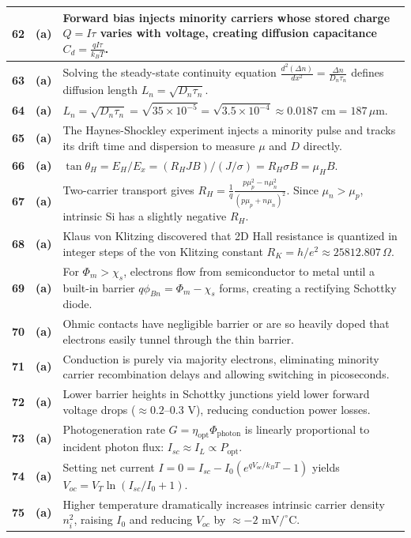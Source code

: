 {\begin{tabularx}{\textwidth}{|c|c|X|}
\textbf{62} & \textbf{(a)} & Forward bias injects minority carriers whose stored charge $Q = I\tau$ varies with voltage, creating diffusion capacitance $C_d = \frac{q I \tau}{k_BT}$. \\ \hline
\textbf{63} & \textbf{(a)} & Solving the steady-state continuity equation $\frac{d^2(\Delta n)}{dx^2} = \frac{\Delta n}{D_n\tau_n}$ defines diffusion length $L_n = \sqrt{D_n\tau_n}$. \\ \hline
\textbf{64} & \textbf{(a)} & $L_n = \sqrt{D_n \tau_n} = \sqrt{35 \times 10^{-5}} = \sqrt{3.5 \times 10^{-4}} \approx 0.0187\text{ cm} = 187\,\mu\text{m}$. \\ \hline
\textbf{65} & \textbf{(a)} & The Haynes-Shockley experiment injects a minority pulse and tracks its drift time and dispersion to measure $\mu$ and $D$ directly. \\ \hline
\textbf{66} & \textbf{(a)} & $\tan\theta_H = E_H / E_x = (R_H J B)/ (J/\sigma) = R_H \sigma B = \mu_H B$. \\ \hline
\textbf{67} & \textbf{(a)} & Two-carrier transport gives $R_H = \frac{1}{q}\frac{p\mu_p^2 - n\mu_n^2}{(p\mu_p + n\mu_n)^2}$. Since $\mu_n > \mu_p$, intrinsic Si has a slightly negative $R_H$. \\ \hline
\textbf{68} & \textbf{(a)} & Klaus von Klitzing discovered that 2D Hall resistance is quantized in integer steps of the von Klitzing constant $R_K = h/e^2 \approx 25812.807\,\Omega$. \\ \hline
\textbf{69} & \textbf{(a)} & For $\Phi_m > \chi_s$, electrons flow from semiconductor to metal until a built-in barrier $q\phi_{Bn} = \Phi_m - \chi_s$ forms, creating a rectifying Schottky diode. \\ \hline
\textbf{70} & \textbf{(a)} & Ohmic contacts have negligible barrier or are so heavily doped that electrons easily tunnel through the thin barrier. \\ \hline
\textbf{71} & \textbf{(a)} & Conduction is purely via majority electrons, eliminating minority carrier recombination delays and allowing switching in picoseconds. \\ \hline
\textbf{72} & \textbf{(a)} & Lower barrier heights in Schottky junctions yield lower forward voltage drops ($\approx 0.2\text{--}0.3\text{ V}$), reducing conduction power losses. \\ \hline
\textbf{73} & \textbf{(a)} & Photogeneration rate $G = \eta_{\text{opt}}\Phi_{\text{photon}}$ is linearly proportional to incident photon flux: $I_{sc} \approx I_L \propto P_{\text{opt}}$. \\ \hline
\textbf{74} & \textbf{(a)} & Setting net current $I = 0 = I_{sc} - I_0(e^{qV_{oc}/k_BT}-1)$ yields $V_{oc} = V_T \ln(I_{sc}/I_0 + 1)$. \\ \hline
\textbf{75} & \textbf{(a)} & Higher temperature dramatically increases intrinsic carrier density $n_i^2$, raising $I_0$ and reducing $V_{oc}$ by $\approx -2\text{ mV/}^\circ\text{C}$. \\ \hline
\end{tabularx}
}

